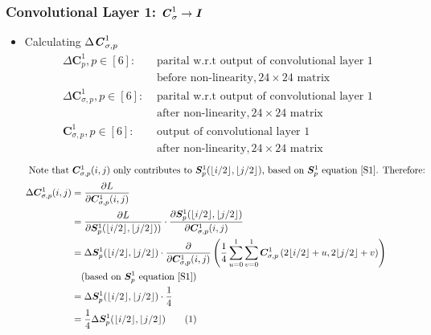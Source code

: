 \documentclass[12pt]{article}
\newcommand\numberthis{\stepcounter{equation}\tag{\theequation}}
\begin{document}
\subsubsection{Convolutional Layer 1: $\textbf{\textit{C}}^1_\sigma \rightarrow \textbf{\textit{I}}$}
\begin{itemize}
\item Calculating $\Delta \textbf{\textit{C}}_{\sigma, p}^1$
\begin{align*}
    \Delta \bm{C}_{p}^1, p \in [6]:& \text{ parital w.r.t output of convolutional layer 1} \\& \text{ before non-linearity}, 24 \times 24 \text{ matrix}\\
    \Delta \bm{C}_{\sigma, p}^1, p \in [6]:& \text{ parital w.r.t output of convolutional layer 1} \\& \text{ after non-linearity}, 24 \times 24 \text{ matrix}\\
    \bm{C}_{\sigma, p}^1, p \in [6]:& \text{ output of convolutional layer 1} \\& \text{ after non-linearity}, 24 \times 24 \text{ matrix}
\end{align*}
\begin{align*}
    \intertext{
    Note that $\bm{C}_{\sigma, p}^1(i, j)$ only contributes to $\bm{S}_{p}^1(\lfloor{i / 2}\rfloor, \lfloor{j / 2}\rfloor)$, based on $\bm{S}_{p}^1$ equation $\eqref{S1}$. Therefore:
    }
    \Delta \bm{C}_{\sigma, p}^1(i, j)
    &= \frac{\partial L}{\partial \bm{C}_{\sigma, p}^1(i, j)}
    \\
    &= \frac{\partial L}{\partial \bm{S}_{p}^1(\lfloor{i / 2}\rfloor, \lfloor{j / 2}\rfloor))}
    \cdot
    \frac{\partial \bm{S}_{p}^1(\lfloor{i / 2}\rfloor, \lfloor{j / 2}\rfloor)}{\partial \bm{C}_{\sigma, p}^1(i, j)}
    \\
    &= \Delta \bm{S}_{p}^1(\lfloor{i / 2}\rfloor, \lfloor{j / 2}\rfloor) \cdot \frac{\partial}{\partial \bm{C}_{\sigma, p}^1(i, j)}\left(\frac{1}{4}\sum_{u = 0}^1\sum_{v = 0}^1\bm{C}^1_{\sigma, p}\left(2\lfloor{i / 2}\rfloor + u, 2\lfloor{j / 2}\rfloor + v\right)\right)
    \\
    &\quad (\text{based on $\bm{S}_{p}^1$ equation } \eqref{S1})
    \\
    &= \Delta \bm{S}_{p}^1(\lfloor{i / 2}\rfloor, \lfloor{j / 2}\rfloor) \cdot \frac{1}{4}\\
    &= \frac{1}{4}\Delta \bm{S}_{p}^1(\lfloor{i / 2}\rfloor, \lfloor{j / 2}\rfloor)
    \numberthis \label{delta_C1_sigma}
\end{align*}


\end{itemize}
\end{document}

